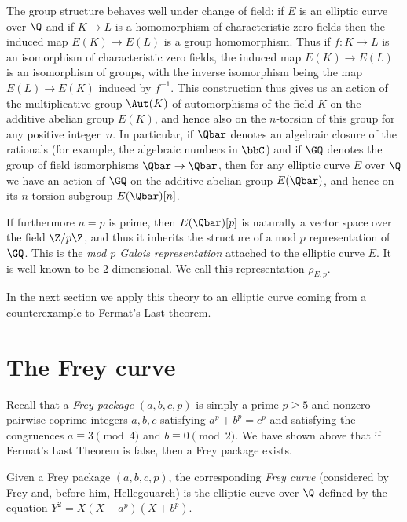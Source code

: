 The group structure behaves well under change of field: if $E$ is an elliptic curve over $\Q$
and if $K\to L$ is a homomorphism of
characteristic zero fields then the induced map $E(K)\to E(L)$ is a group homomorphism.
Thus if $f:K\to L$ is an isomorphism of characteristic zero fields, the induced map $E(K)\to E(L)$
is an isomorphism of groups, with the inverse isomorphism being the map $E(L)\to E(K)$ induced
by $f^{-1}$. This construction thus gives us an action of the multiplicative group $\Aut(K)$
of automorphisms of the field $K$ on the additive abelian group $E(K)$, and hence also
on the $n$-torsion of this group for any positive integer~$n$.
In particular, if $\Qbar$ denotes an algebraic closure of the
rationals (for example, the algebraic numbers in $\bbC$) and if $\GQ$ denotes the group of field
isomorphisms $\Qbar\to\Qbar$, then for any elliptic curve $E$ over $\Q$ we have an action
of $\GQ$ on the additive abelian group $E(\Qbar)$, and hence on its $n$-torsion subgroup
$E(\Qbar)[n]$.

If furthermore $n=p$ is prime, then $E(\Qbar)[p]$ is naturally a vector space over the
field $\Z/p\Z$, and thus it inherits the structure of a mod $p$ representation of $\GQ$.
This is the \emph{mod $p$ Galois representation} attached to the elliptic curve $E$.
It is well-known to be 2-dimensional. We call this representation $\rho_{E,p}$.

In the next section we apply this theory to an elliptic curve coming from a counterexample to
Fermat's Last theorem.

\section{The Frey curve}

Recall that a \emph{Frey package} $(a,b,c,p)$ is simply a prime $p\geq5$ and nonzero
pairwise-coprime integers $a,b,c$ satisfying $a^p+b^p=c^p$ and satisfying the congruences
$a\equiv3\pmod4$ and $b\equiv0\pmod2$. We have shown above that if Fermat's Last Theorem is false,
then a Frey package exists.

\begin{definition}[Frey]
  \label{FreyCurve}
  \leanok
  Given a Frey package $(a,b,c,p)$, the corresponding \emph{Frey curve} (considered by Frey and,
  before him, Hellegouarch) is the elliptic curve over $\Q$ defined by the equation
  $Y^2=X(X-a^p)(X+b^p).$
\end{definition}

